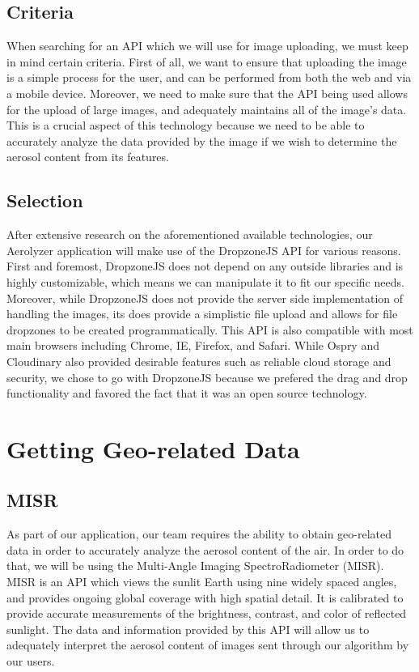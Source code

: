 \documentclass[letterpaper,10pt,draftclsnofoot,onecolumn]{IEEEtran}
\begin{document}
\begin{flushleft}
\subsection{Criteria}
When searching for an API which we will use for image uploading, we must keep in mind certain criteria. First of all, we want to ensure that uploading the image is a simple process for the user, and can be performed from both the web and via a mobile device. Moreover, we need to make sure that the API being used allows for the upload of large images, and adequately maintains all of the image’s data. This is a crucial aspect of this technology because we need to be able to accurately analyze the data provided by the image if we wish to determine the aerosol content from its features.
\subsection{Selection}
After extensive research on the aforementioned available technologies, our Aerolyzer application will make use of the DropzoneJS API for various reasons. First and foremost, DropzoneJS does not depend on any outside libraries and is highly customizable, which means we can manipulate it to fit our specific needs. Moreover, while DropzoneJS does not provide the server side implementation of handling the images, its does provide a simplistic file upload and allows for file dropzones to be created programmatically. This API is also compatible with most main browsers including Chrome, IE, Firefox, and Safari\cite{14}. While Ospry and Cloudinary also provided desirable features such as reliable cloud storage and security, we chose to go with DropzoneJS because we prefered the drag and drop functionality and favored the fact that it was an open source technology. 


\section{Getting Geo-related Data}
\subsection{MISR}
As part of our application, our team requires the ability to obtain geo-related data in order to accurately analyze the aerosol content of the air. In order to do that, we will be using the Multi-Angle Imaging SpectroRadiometer (MISR). MISR is an API which views the sunlit Earth using nine widely spaced angles, and provides ongoing global coverage with high spatial detail. It is calibrated to provide accurate measurements of the brightness, contrast, and color of reflected sunlight\cite{20}. The data and information provided by this API will allow us to adequately interpret the aerosol content of images sent through our algorithm by our users.

\end{flushleft}
\end{document}
